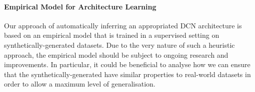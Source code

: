 \paragraph{Empirical Model for Architecture Learning} Our approach of automatically inferring an appropriated DCN architecture is based on an empirical model that is trained in a supervised setting on synthetically-generated datasets. Due to the very nature of such a heuristic approach, the empirical model should be subject to ongoing research and improvements. In particular, it could be beneficial to analyse how we can ensure that the synthetically-generated have similar properties to real-world datasets in order to allow a maximum level of generalisation.  




%



